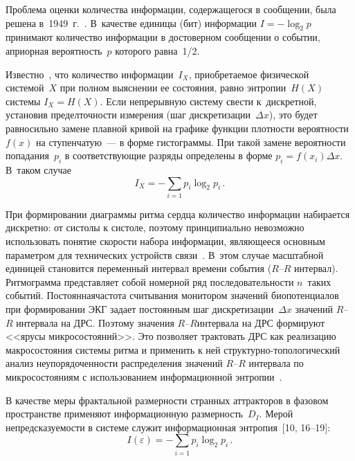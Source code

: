 \begin{multicols}{2}
    Проблема оценки количества информации, содержащегося в сообщении, 
была решена в~1949~г.~\cite{14ku}. В~качестве единицы (бит) информации 
$I=-\log_2 p$ принимают количество информации в достоверном сообщении о 
событии, априорная вероятность~$p$ которого равна~1/2. 
  
  Известно~\cite{10ku, 15ku}, что количество информации~$I_X$, 
приобретаемое физической системой~$X$ при полном выяснении ее состояния, 
равно энтропии~$H(X)$ системы $I_X=H(X)$. Если непрерывную систему 
свести к~дискретной, установив предел\linebreak точности измерения (шаг 
дискретизации~$\Delta x$), это будет равносильно замене плавной кривой на 
графике функции плотности вероятности~$f(x)$ на ступенчатую~--- в форме 
гистограммы. При такой замене вероятности попадания~$p_i$ в 
соответствующие разряды определены в форме $p_i=f(x_i)\Delta x$. В~таком 
случае 
  \begin{equation}
  I_X =-\sum\limits_{i=1} p_i \log_2 p_i\,.
  \label{e1ku}
  \end{equation}
  
  При формировании диаграммы ритма сердца количество информации 
набирается дискретно: от систолы к систоле, поэтому принципиально 
невозможно использовать понятие скорости набора информации, являющееся 
основным параметром для технических устройств связи~\cite{15ku}. В~этом 
случае масштабной единицей становится переменный интервал времени 
события ($R$--$R$ интервал). Ритмограмма представляет собой номерной ряд 
последовательности $n$~таких событий. Постоянная\linebreak частота считывания 
монитором значений биопотенциалов при формировании ЭКГ задает 
постоянным шаг дискретизации~$\Delta x$ значений $R$--$R$ интервала на 
ДРС. Поэтому значения $R$--$R$\linebreak интервала на ДРС формируют <<ярусы 
микросостояний>>. Это позволяет трактовать ДРС как реализацию 
макросостояния системы ритма и применить к ней 
  струк\-тур\-но-то\-по\-ло\-ги\-че\-ский анализ неупорядоченности 
распределения значений $R$--$R$ интервала по микросостояниям с 
использованием информационной энтропии~\cite{6ku, 10ku}. 
  
  В качестве меры фрактальной размерности странных аттракторов в фазовом 
пространстве применяют информационную размерность~$D_I$. Мерой 
непредсказуемости в системе служит информационная энтропия~[10, 16--19]:
  \begin{equation}
  I(\varepsilon ) =-\sum\limits_{i=1} p_i\log_2 p_i\,.
  \label{e2ku}
  \end{equation}
  

\end{multicols}
